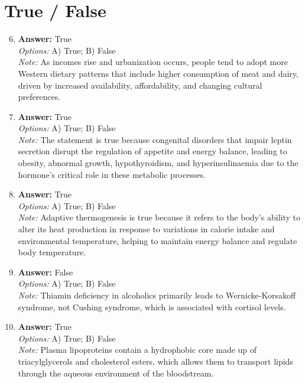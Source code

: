 \documentclass[12pt]{article}
\begin{document}
\section*{True / False}
\begin{enumerate}[label=\arabic*.]
\setcounter{enumi}{5}
\item \textbf{Answer:} True
\\ \textit{Options:} A) True; B) False
\\ \textit{Note:} As incomes rise and urbanization occurs, people tend to adopt more Western dietary patterns that include higher consumption of meat and dairy, driven by increased availability, affordability, and changing cultural preferences.
\item \textbf{Answer:} True
\\ \textit{Options:} A) True; B) False
\\ \textit{Note:} The statement is true because congenital disorders that impair leptin secretion disrupt the regulation of appetite and energy balance, leading to obesity, abnormal growth, hypothyroidism, and hyperinsulinaemia due to the hormone's critical role in these metabolic processes.
\item \textbf{Answer:} True
\\ \textit{Options:} A) True; B) False
\\ \textit{Note:} Adaptive thermogenesis is true because it refers to the body's ability to alter its heat production in response to variations in calorie intake and environmental temperature, helping to maintain energy balance and regulate body temperature.
\item \textbf{Answer:} False
\\ \textit{Options:} A) True; B) False
\\ \textit{Note:} Thiamin deficiency in alcoholics primarily leads to Wernicke-Korsakoff syndrome, not Cushing syndrome, which is associated with cortisol levels.
\item \textbf{Answer:} True
\\ \textit{Options:} A) True; B) False
\\ \textit{Note:} Plasma lipoproteins contain a hydrophobic core made up of triacylglycerols and cholesterol esters, which allows them to transport lipids through the aqueous environment of the bloodstream.
\end{enumerate}
\end{document}

